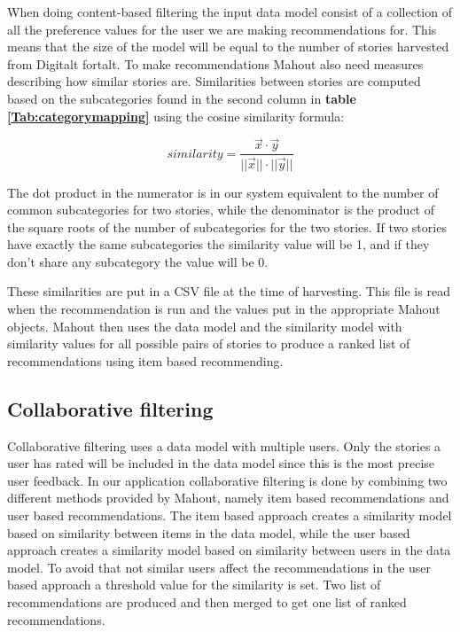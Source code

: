 When doing content-based filtering the input data model consist of a collection of all the preference values for the user we are making recommendations for. This means that the size of the model will be equal to the number of stories harvested from Digitalt fortalt. To make recommendations Mahout also need measures describing how similar stories are. Similarities between stories are computed based on the subcategories found in the second column in \textbf{table \ref{Tab:categorymapping}} using the cosine similarity formula: 

\begin{equation}
similarity = \frac{\vec{x}\cdot\vec{y}}{||\vec{x}||\cdot||\vec{y}||}
\end{equation}

The dot product in the numerator is in our system equivalent to the number of common subcategories for two stories, while the denominator is the product of the square roots of the number of subcategories for the two stories. If two stories have exactly the same subcategories the similarity value will be 1, and if they don't share any subcategory the value will be 0. \newline

These similarities are put in a CSV file at the time of harvesting. This file is read when the recommendation is run and the values put in the appropriate Mahout objects. Mahout then uses the data model and the similarity model with similarity values for all possible pairs of stories to produce a ranked list of recommendations using item based recommending.


\subsection{Collaborative filtering}

Collaborative filtering uses a data model with multiple users. Only the stories a user has rated will be included in the data model since this is the most precise user feedback. In our application collaborative filtering is done by combining two different methods provided by Mahout, namely item based recommendations and user based recommendations. The item based approach creates a similarity model based on similarity between items in the data model, while the user based approach creates a similarity model based on similarity between users in the data model. To avoid that not similar users affect the recommendations in the user based approach a threshold value for the similarity is set. Two list of recommendations are produced and then merged to get one list of ranked recommendations.\newline

